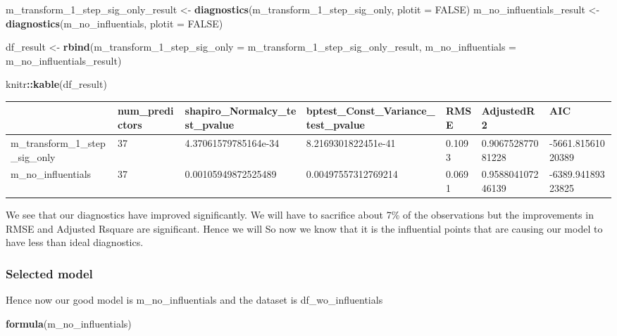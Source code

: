 \documentclass[
]{article}
\newenvironment{Shaded}{\begin{snugshade}}{\end{snugshade}}
\newcommand{\DataTypeTok}[1]{\textcolor[rgb]{0.13,0.29,0.53}{#1}}
\newcommand{\DecValTok}[1]{\textcolor[rgb]{0.00,0.00,0.81}{#1}}
\newcommand{\KeywordTok}[1]{\textcolor[rgb]{0.13,0.29,0.53}{\textbf{#1}}}
\newcommand{\NormalTok}[1]{#1}
\newcommand{\OperatorTok}[1]{\textcolor[rgb]{0.81,0.36,0.00}{\textbf{#1}}}
\newcommand{\OtherTok}[1]{\textcolor[rgb]{0.56,0.35,0.01}{#1}}
\newcommand{\StringTok}[1]{\textcolor[rgb]{0.31,0.60,0.02}{#1}}
\begin{document}
\begin{Shaded}
\begin{Highlighting}[]
\NormalTok{m_transform_}\DecValTok{1}\NormalTok{_step_sig_only_result <-}\StringTok{ }\KeywordTok{diagnostics}\NormalTok{(m_transform_}\DecValTok{1}\NormalTok{_step_sig_only, }\DataTypeTok{plotit =} \OtherTok{FALSE}\NormalTok{)}
\NormalTok{m_no_influentials_result <-}\StringTok{ }\KeywordTok{diagnostics}\NormalTok{(m_no_influentials, }\DataTypeTok{plotit =} \OtherTok{FALSE}\NormalTok{)}

\NormalTok{df_result <-}\StringTok{ }\KeywordTok{rbind}\NormalTok{(}\DataTypeTok{m_transform_1_step_sig_only =}\NormalTok{ m_transform_}\DecValTok{1}\NormalTok{_step_sig_only_result, }
                   \DataTypeTok{m_no_influentials =}\NormalTok{ m_no_influentials_result)}

\NormalTok{knitr}\OperatorTok{::}\KeywordTok{kable}\NormalTok{(df_result)}
\end{Highlighting}
\end{Shaded}

\begin{tabular}{l|l|l|l|l|l|l}
\hline
  & num\_predictors & shapiro\_Normalcy\_test\_pvalue & bptest\_Const\_Variance\_test\_pvalue & RMSE & AdjustedR2 & AIC\\
\hline
m\_transform\_1\_step\_sig\_only & 37 & 4.37061579785164e-34 & 8.2169301822451e-41 & 0.1093 & 0.906752877081228 & -5661.81561020389\\
\hline
m\_no\_influentials & 37 & 0.00105949872525489 & 0.00497557312769214 & 0.0691 & 0.958804107246139 & -6389.94189323825\\
\hline
\end{tabular}

We see that our diagnostics have improved significantly. We will have to sacrifice about 7\% of the observations but the improvements in RMSE and Adjusted Rsquare are significant. Hence we will So now we know that it is the influential points that are causing our model to have less than ideal diagnostics.

\hypertarget{selected-model}{%
\subsubsection{Selected model}\label{selected-model}}

Hence now our good model is m\_no\_influentials and the dataset is df\_wo\_influentials

\begin{Shaded}
\begin{Highlighting}[]
\KeywordTok{formula}\NormalTok{(m_no_influentials)}
\end{Highlighting}
\end{Shaded}
\end{document}

